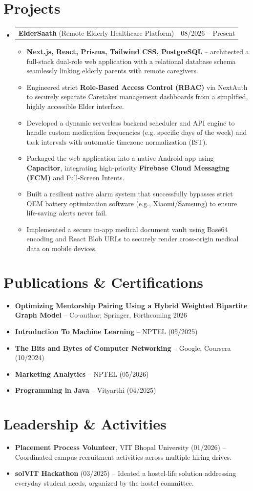 ﻿\documentclass[letterpaper,10pt]{article}
\makeatletter
\newcommand{\resumeItem}[1]{
  \item\small{
    {#1 \vspace{-2pt}}
  }
}
\newcommand{\resumeProjectHeading}[2]{
    \item
    \begin{tabular*}{0.97\textwidth}{l@{\extracolsep{\fill}}r}
      \small#1 & #2 \\
    \end{tabular*}\vspace{-7pt}
}
\newcommand{\resumeSubHeadingListStart}{\begin{itemize}[leftmargin=0.15in, label={}]}
\newcommand{\resumeSubHeadingListEnd}{\end{itemize}}
\newcommand{\resumeItemListStart}{\begin{itemize}}
\newcommand{\resumeItemListEnd}{\end{itemize}\vspace{-5pt}}
\makeatother
\begin{document}
\section{Projects}
    \resumeSubHeadingListStart
      \resumeProjectHeading
          {\textbf{ElderSaath} (Remote Elderly Healthcare Platform)}{08/2026 -- Present}
          \resumeItemListStart
            \resumeItem{\textbf{Next.js, React, Prisma, Tailwind CSS, PostgreSQL} -- architected a full-stack dual-role web application with a relational database schema seamlessly linking elderly parents with remote caregivers.}
            \resumeItem{Engineered strict \textbf{Role-Based Access Control (RBAC)} via NextAuth to securely separate Caretaker management dashboards from a simplified, highly accessible Elder interface.}
            \resumeItem{Developed a dynamic serverless backend scheduler and API engine to handle custom medication frequencies (e.g. specific days of the week) and task intervals with automatic timezone normalization (IST).}
            \resumeItem{Packaged the web application into a native Android app using \textbf{Capacitor}, integrating high-priority \textbf{Firebase Cloud Messaging (FCM)} and Full-Screen Intents.}
            \resumeItem{Built a resilient native alarm system that successfully bypasses strict OEM battery optimization software (e.g., Xiaomi/Samsung) to ensure life-saving alerts never fail.}
            \resumeItem{Implemented a secure in-app medical document vault using Base64 encoding and React Blob URLs to securely render cross-origin medical data on mobile devices.}
          \resumeItemListEnd
    \resumeSubHeadingListEnd

\section{Publications \& Certifications}
  \resumeSubHeadingListStart
    \resumeItem{\textbf{Optimizing Mentorship Pairing Using a Hybrid Weighted Bipartite Graph Model} -- Co-author; Springer, Forthcoming 2026}
    \resumeItem{\textbf{Introduction To Machine Learning} -- NPTEL (05/2025)}
    \resumeItem{\textbf{The Bits and Bytes of Computer Networking} -- Google, Coursera (10/2024)}
    \resumeItem{\textbf{Marketing Analytics} -- NPTEL (05/2026)}
    \resumeItem{\textbf{Programming in Java} -- Vityarthi (04/2025)}
  \resumeSubHeadingListEnd

\section{Leadership \& Activities}
  \resumeSubHeadingListStart
    \resumeItem{\textbf{Placement Process Volunteer}, VIT Bhopal University (01/2026) -- Coordinated campus recruitment activities across multiple hiring drives.}
    \resumeItem{\textbf{solVIT Hackathon} (03/2025) -- Ideated a hostel-life solution addressing everyday student needs, organized by the hostel committee.}
  \resumeSubHeadingListEnd
\end{document}
